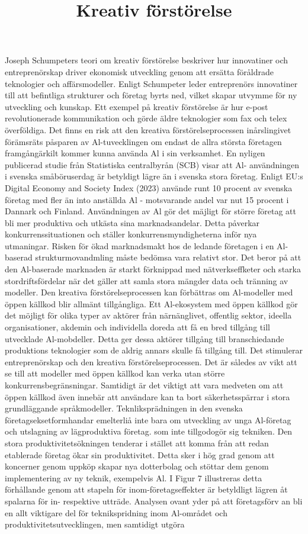 {{{{{{{{{{{{{{\title{
Kreativ förstörelse
}
Joseph Schumpeters teori om kreativ förstörelse beskriver hur innovatiner och entreprenörskap driver ekonomisk utveckling genom att ersätta föråldrade teknologier och affärsmodeller. Enligt Schumpeter leder entreprenörs innovatiner till att befintliga strukturer och företag byrts ned, vilket skapar utvymme för ny utveckling och kunskap. Ett exempel på kreativ förstörelse är hur e-post revolutionerade kommunikation och görde äldre teknologier som fax och telex överföldiga.
Det finns en risk att den kreativa förstörelseprocessen inårslingivet förämsräts påsparen av Al-tuvecklingen om endast de allra största företagen framgångärkilt kommer kunna använda \(\mathrm{Al}\) i sin verksamhet. En nyligen publicerad studie från Statistiska centralbyrån (SCB) visar att Al- användningen i svenska småböruserdag är betyldigt lägre än i svenska stora företag. Enligt EU:s Digital Economy and Society Index (2023) använde runt 10 procent av svenska företag med fler än into anställda Al - motsvarande andel var nut 15 procent i Dannark och Finland.
Användningen av Al gör det mäjligt för större företag att bli mer produktiva och utkästa sina marknadsandelar. Detta påverkar konkurrenssituationen och ställer konkurrensmyndigheterna inför nya utmaningar. Risken för ökad marknadsmakt hos de ledande företagen i en Al-baserad strukturmovandmling måste bedömsa vara relativt stor. Det beror på att den Al-baserade marknaden är starkt förknippad med nätverkseffketer och starka stordriftsfördelar när det gäller att samla stora mängder data och tränning av modeller.
Den kreativa förstörelseprocessen kan förbättras om Al-modeller med öppen källkod blir allmänt tillgångliga. Ett Al-ekosystem med öppen källkod gör det möjligt för olika typer av aktörer från närnänglivet, offentlig sektor, ideella organisationer, akdemin och individella doreda att få en bred tillgång till utvecklade Al-mobdeller. Detta ger dessa aktörer tillgång till branschiedande produktions teknologier som de aldrig annars skulle få tillgång till. Det stimulerar entreprenörskap och den kreativa förstörelseprocessen. Det är således av vikt att se till att modeller med öppen källkod kan verka utan större konkurrensbegränsningar. Samtidigt är det viktigt att vara medveten om att öppen källkod även innebär att användare kan ta bort säkerhetsspärrar i stora grundläggande språkmodeller.
Teknliksprädningen in den svenska företagseksetformhandar emelterliå inte bara om utveckling av unga Al-företag och utslagning av lägproduktiva företag. som inte tillgodogör sig tekniken. Den stora produktivitetsökningen tenderar i stället att komma från att redan etablerade företag ökar sin produktivitet. Detta sker i hög grad genom att koncerner genom uppköp skapar nya dotterbolag och stöttar dem genom implementering av ny teknik, exempelvis Al. I Figur 7 illustreras detta förhållande genom att stapeln för inom-företagseffekter är betyldligt lägren åt spalarna för in- respektive utträde.
Analysen ovant yder på att företagsförv an bli en allt viktigare del för teknikspridning inom Al-området och produktivitetsutvecklingen, men samtidigt utgöra

}}}}}}}}}}}}}}
